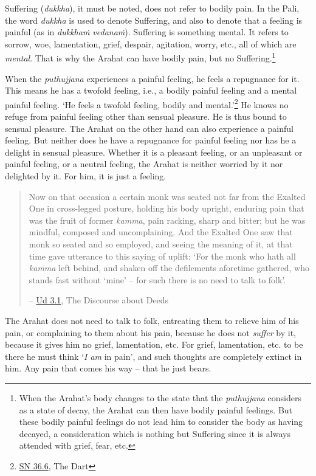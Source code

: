 Suffering (\textit{dukkha}), it must be noted, does not refer to bodily pain. In the Pali, the word \textit{dukkha} is used to denote Suffering, and also to denote that a feeling is painful (as in \textit{dukkhaṁ vedanaṁ}). Suffering is something mental. It refers to sorrow, woe, lamentation, grief, despair, agitation, worry, etc., all of which are \emph{mental}. That is why the Arahat can have bodily pain, but no Suffering.\footnote{When the Arahat's body changes to the state that the \textit{puthujjana} considers as a state of decay, the Arahat can then have bodily painful feelings. But these bodily painful feelings do not lead him to consider the body as having decayed, a consideration which is nothing but Suffering since it is always attended with grief, fear, etc.}

When the \textit{puthujjana} experiences a painful feeling, he feels a repugnance for it. This means he has a twofold feeling, i.e., a bodily painful feeling and a mental painful feeling. `He feels a twofold feeling, bodily and mental.'\footnote{\href{https://suttacentral.net/sn36.6/en/bodhi}{SN 36.6}, The Dart} He knows no refuge from painful feeling other than sensual pleasure. He is thus bound to sensual pleasure. The Arahat on the other hand can also experience a painful feeling. But neither does he have a repugnance for painful feeling nor has he a delight in sensual pleasure. Whether it is a pleasant feeling, or an unpleasant or painful feeling, or a neutral feeling, the Arahat is neither worried by it nor delighted by it. For him, it is just a feeling.

\begin{quote}
Now on that occasion a certain monk was seated not far from the Exalted One in cross-legged posture, holding his body upright, enduring pain that was the fruit of former \textit{kamma}, pain racking, sharp and bitter; but he was mindful, composed and uncomplaining. And the Exalted One saw that monk so seated and so employed, and seeing the meaning of it, at that time gave utterance to this saying of uplift: `For the monk who hath all \textit{kamma} left behind, and shaken off the defilements aforetime gathered, who stands fast without `mine' -- for such there is no need to talk to folk'.

 -- \href{https://suttacentral.net/ud3.1/en/anandajoti}{Ud 3.1}, The Discourse about Deeds
\end{quote}

The Arahat does not need to talk to folk, entreating them to relieve him of his pain, or complaining to them about his pain, because he does not \emph{suffer} by it, because it gives him no grief, lamentation, etc. For grief, lamentation, etc. to be there he must think `\emph{I am} in pain', and such thoughts are completely extinct in him. Any pain that comes his way -- that he just bears.

